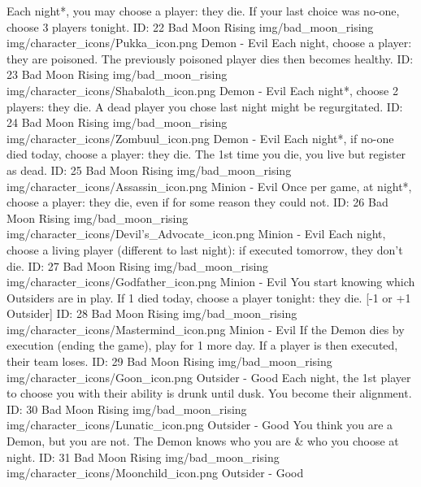 	{Each night*, you may choose a player: they die. If your last choice was no-one, choose 3 players tonight.}        
	{ID: 22}
	{Bad Moon Rising}
	{img/bad_moon_rising}
	{img/character_icons/Pukka_icon.png}
	{\color{evilcolor}Demon - Evil}
	{Each night, choose a player: they are poisoned. The previously poisoned player dies then becomes healthy.}        
	{ID: 23}
	{Bad Moon Rising}
	{img/bad_moon_rising}
	{img/character_icons/Shabaloth_icon.png}
	{\color{evilcolor}Demon - Evil}
	{Each night*, choose 2 players: they die. A dead player you chose last night might be regurgitated.}        
	{ID: 24}
	{Bad Moon Rising}
	{img/bad_moon_rising}
	{img/character_icons/Zombuul_icon.png}
	{\color{evilcolor}Demon - Evil}
	{Each night*, if no-one died today, choose a player: they die. The 1st time you die, you live but register as dead.}        
	{ID: 25}
	{Bad Moon Rising}
	{img/bad_moon_rising}
	{img/character_icons/Assassin_icon.png}
	{\color{evilcolor}Minion - Evil}
	{Once per game, at night*, choose a player: they die, even if for some reason they could not.}        
	{ID: 26}
	{Bad Moon Rising}
	{img/bad_moon_rising}
	{img/character_icons/Devil's_Advocate_icon.png}
	{\color{evilcolor}Minion - Evil}
	{Each night, choose a living player (different to last night): if executed tomorrow, they don't die.}        
	{ID: 27}
	{Bad Moon Rising}
	{img/bad_moon_rising}
	{img/character_icons/Godfather_icon.png}
	{\color{evilcolor}Minion - Evil}
	{You start knowing which Outsiders are in play. If 1 died today, choose a player tonight: they die. [-1 or +1 Outsider]}        
	{ID: 28}
	{Bad Moon Rising}
	{img/bad_moon_rising}
	{img/character_icons/Mastermind_icon.png}
	{\color{evilcolor}Minion - Evil}
	{If the Demon dies by execution (ending the game), play for 1 more day. If a player is then executed, their team loses.}        
	{ID: 29}
	{Bad Moon Rising}
	{img/bad_moon_rising}
	{img/character_icons/Goon_icon.png}
	{\color{goodcolor}Outsider - Good}
	{Each night, the 1st player to choose you with their ability is drunk until dusk. You become their alignment.}        
	{ID: 30}
	{Bad Moon Rising}
	{img/bad_moon_rising}
	{img/character_icons/Lunatic_icon.png}
	{\color{goodcolor}Outsider - Good}
	{You think you are a Demon, but you are not. The Demon knows who you are \& who you choose at night.}        
	{ID: 31}
	{Bad Moon Rising}
	{img/bad_moon_rising}
	{img/character_icons/Moonchild_icon.png}
	{\color{goodcolor}Outsider - Good}
